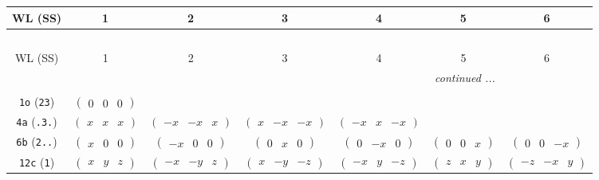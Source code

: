 \documentclass[fleqn,9pt,landscape]{jsarticle}
\begin{document}
\begin{center}
\renewcommand{\arraystretch}{1.2}
\begin{longtable}{ccccccc}
 \hline \hline
WL (SS) & 1 & 2 & 3 & 4 & 5 & 6 \\ \hline \endfirsthead

\multicolumn{6}{l}{\tablename\ \thetable{}} \\
 \hline \hline
WL (SS) & 1 & 2 & 3 & 4 & 5 & 6 \\ \hline \endhead

 \hline \hline
\multicolumn{6}{r}{\footnotesize\it continued ...} \\ \endfoot

 \hline \hline
\multicolumn{6}{r}{} \\ \endlastfoot

{\tt 1o} ({\tt 23}) & $ \begin{pmatrix} 0 & 0 & 0 \end{pmatrix} $ & $  $ & $  $ & $  $ & $  $ & $  $ \\ \hline
{\tt 4a} ({\tt .3.}) & $ \begin{pmatrix} x & x & x \end{pmatrix} $ & $ \begin{pmatrix} - x & - x & x \end{pmatrix} $ & $ \begin{pmatrix} x & - x & - x \end{pmatrix} $ & $ \begin{pmatrix} - x & x & - x \end{pmatrix} $ & $  $ & $  $ \\ \hline
{\tt 6b} ({\tt 2..}) & $ \begin{pmatrix} x & 0 & 0 \end{pmatrix} $ & $ \begin{pmatrix} - x & 0 & 0 \end{pmatrix} $ & $ \begin{pmatrix} 0 & x & 0 \end{pmatrix} $ & $ \begin{pmatrix} 0 & - x & 0 \end{pmatrix} $ & $ \begin{pmatrix} 0 & 0 & x \end{pmatrix} $ & $ \begin{pmatrix} 0 & 0 & - x \end{pmatrix} $ \\ \hline
{\tt 12c} ({\tt 1}) & $ \begin{pmatrix} x & y & z \end{pmatrix} $ & $ \begin{pmatrix} - x & - y & z \end{pmatrix} $ & $ \begin{pmatrix} x & - y & - z \end{pmatrix} $ & $ \begin{pmatrix} - x & y & - z \end{pmatrix} $ & $ \begin{pmatrix} z & x & y \end{pmatrix} $ & $ \begin{pmatrix} - z & - x & y \end{pmatrix} $ \\

\end{longtable}
\end{center}
\end{document}
